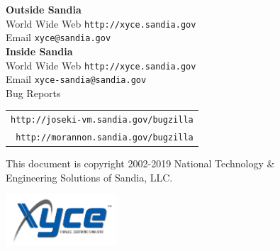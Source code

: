 \noindent
\textbf{Outside Sandia}\\
World Wide Web \hfill 
  \texttt{\color{XyceDeepRed}http://xyce.sandia.gov}
\\
Email \hfill
  \texttt{\color{XyceDeepRed}xyce@sandia.gov}
\\

\noindent
\textbf{Inside Sandia}\\
World Wide Web \hfill 
  \texttt{\color{XyceDeepRed}http://xyce.sandia.gov}
\\
Email \hfill
  \texttt{\color{XyceDeepRed}xyce-sandia@sandia.gov}
\\
Bug Reports \hfill 
\begin{tabular}{r}
  \texttt{\color{XyceDeepRed}http://joseki-vm.sandia.gov/bugzilla} \\
  \texttt{\color{XyceDeepRed}http://morannon.sandia.gov/bugzilla} 
\end{tabular}

\vfill
\noindent
\parbox{\textwidth}{
     \parbox{4.1in}{\small This document is  copyright \textcopyright{}
     2002-2019 National Technology \&\\Engineering Solutions of Sandia, LLC.}
     \hfill
     \includegraphics[height=0.75in]{xyce_flat_white}
}

